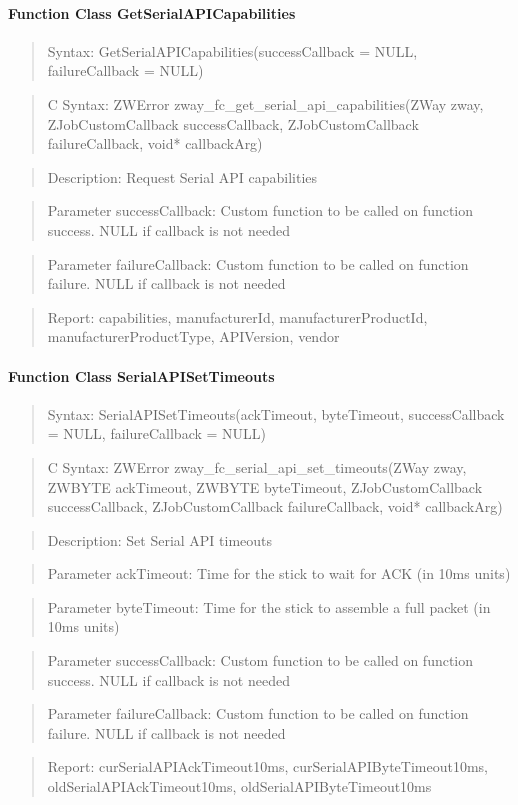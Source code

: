 
\paragraph{Function Class GetSerialAPICapabilities}
\begin{quote}Syntax: GetSerialAPICapabilities(successCallback = NULL, failureCallback = NULL)\end{quote}
\begin{quote}C Syntax: ZWError zway\_fc\_get\_serial\_api\_capabilities(ZWay zway, ZJobCustomCallback successCallback, ZJobCustomCallback failureCallback, void* callbackArg)\end{quote}
\begin{quote}Description: Request Serial API capabilities\end{quote}
\begin{quote}Parameter successCallback: Custom function to be called on function success. NULL if callback is not needed\end{quote}
\begin{quote}Parameter failureCallback: Custom function to be called on function failure. NULL if callback is not needed\end{quote}
\begin{quote}Report: capabilities, manufacturerId, manufacturerProductId, manufacturerProductType, APIVersion, vendor\end{quote}

\paragraph{Function Class SerialAPISetTimeouts}
\begin{quote}Syntax: SerialAPISetTimeouts(ackTimeout, byteTimeout, successCallback = NULL, failureCallback = NULL)\end{quote}
\begin{quote}C Syntax: ZWError zway\_fc\_serial\_api\_set\_timeouts(ZWay zway, ZWBYTE ackTimeout, ZWBYTE byteTimeout, ZJobCustomCallback successCallback, ZJobCustomCallback failureCallback, void* callbackArg)\end{quote}
\begin{quote}Description: Set Serial API timeouts\end{quote}
\begin{quote}Parameter ackTimeout: Time for the stick to wait for ACK (in 10ms units)\end{quote}
\begin{quote}Parameter byteTimeout: Time for the stick to assemble a full packet (in 10ms units)\end{quote}
\begin{quote}Parameter successCallback: Custom function to be called on function success. NULL if callback is not needed\end{quote}
\begin{quote}Parameter failureCallback: Custom function to be called on function failure. NULL if callback is not needed\end{quote}
\begin{quote}Report: curSerialAPIAckTimeout10ms, curSerialAPIByteTimeout10ms, oldSerialAPIAckTimeout10ms, oldSerialAPIByteTimeout10ms\end{quote}

